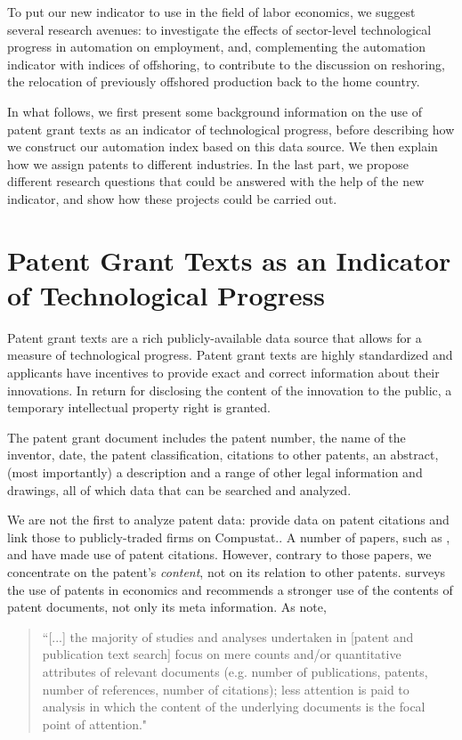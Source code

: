 \documentclass[11pt,a4paper]{article}
\begin{document}
To put our new indicator to use in the field of labor economics, we suggest several research avenues: to investigate the effects of sector-level technological progress in automation on employment, and, complementing the automation indicator with indices of offshoring, to contribute to the discussion on reshoring, the relocation of previously offshored production back to the home country.

In what follows, we first present some background information on the use of patent grant texts as an indicator of technological progress, before describing how we construct our automation index based on this data source. We then explain how we assign patents to different industries. In the last part, we propose different research questions that could be answered with the help of the new indicator, and show how these projects could be carried out.


\section{Patent Grant Texts as an Indicator of Technological Progress}
Patent grant texts are a rich publicly-available data source that allows for a measure of technological progress. Patent grant texts are highly standardized and applicants have incentives to provide exact and correct information about their innovations. In return for disclosing the content of the innovation to the public, a temporary intellectual property right is granted. 

The patent grant document includes the patent number, the name of the inventor, date, the patent classification, citations to other patents, an abstract, (most importantly) a description and a range of other legal information and drawings, all of which data that can be searched and analyzed. 

We are not the first to analyze patent data: \cite{HJT2001} provide data on patent citations and link those to publicly-traded firms on Compustat.. A number of papers, such as \cite{AAC2014} , \cite{ABP2015} and \cite{BCJPV2015} have made use of patent citations. However, contrary to those papers, we concentrate on the patent's \textit{content}, not on its relation to other patents.  \cite{G1998} surveys the use of patents in economics and recommends a stronger use of the contents of patent documents, not only its meta information.
As \citep[p.~290]{MVS2010} note, 
\begin{quotation} 
``[...] the majority of studies and analyses undertaken in [patent and publication text search] focus on mere counts and/or quantitative attributes of relevant documents (e.g. number of publications, patents, number of references, number of citations); less attention is paid to analysis in which the content of the underlying documents is the focal point of attention."
\end{quotation}
\end{document}
